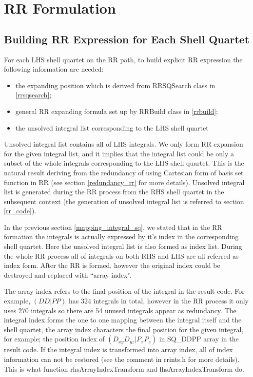 

\section{RR Formulation}

\subsection{Building RR Expression for Each Shell Quartet}
%
%
%
For each LHS shell quartet on the RR path, to build explicit RR expression
the following information are needed:
\begin{itemize}
 \item the expanding position which is derived from RRSQSearch class in 
 \ref{rrsqsearch};
 \item general RR expanding formula set up by RRBuild class in \ref{rrbuild};
 \item the unsolved integral list corresponding to the LHS shell quartet 
\end{itemize}
Unsolved integral list contains all of LHS integrals. We only form RR expansion
for the given integral list, and it implies that the integral list could be 
only a subset of the whole integrals corresponding to the LHS shell quartet.
This is the natural result deriving from the redundancy of using Cartesian
form of basis set function in RR (see section \ref{redundancy_rr} for more
details). Unsolved integral list is generated during the RR process from
the RHS shell quartet in the subsequent context (the generation of unsolved
integral list is referred to section \ref{rr_code}).

In the previous section \ref{mapping_integral_sq}, we stated that
in the RR formation the integrals is actually expressed by it's index
in the corresponding shell quartet. Here the unsolved integral list
is also formed as index list. During the whole RR process all of integrals
on both RHS and LHS are all referred as index form. After the RR is formed,
however the original index could be destroyed and replaced with ``array index''.

The array index refers to the final position of the integral in the result
code. For example, $(DD|PP)$ has 324 integrals in total, however in the RR
process it only uses 270 integrals so there are 54 unused integrals appear
as redundancy. The integral index forms the one to one mapping between  
the integral itself and the shell quartet, the array index characters the 
final position for the given integral, for example; the position index of 
$(D_{xy}D_{yz}|P_{x}P_{z})$ in SQ\_DDPP array in the result code. If the 
integral index is transformed into array index, all of index information
can not be restored (see the comment in rrints.h for more details). This 
is what function rhsArrayIndexTransform and lhsArrayIndexTransform do.

